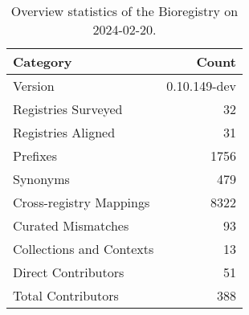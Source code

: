 \begin{table}
\caption{Overview statistics of the Bioregistry on 2024-02-20.}
\label{tab:bioregistry-summary}
\begin{tabular}{lr}
\toprule
Category & Count \\
\midrule
Version & 0.10.149-dev \\
Registries Surveyed & 32 \\
Registries Aligned & 31 \\
Prefixes & 1756 \\
Synonyms & 479 \\
Cross-registry Mappings & 8322 \\
Curated Mismatches & 93 \\
Collections and Contexts & 13 \\
Direct Contributors & 51 \\
Total Contributors & 388 \\
\bottomrule
\end{tabular}
\end{table}
